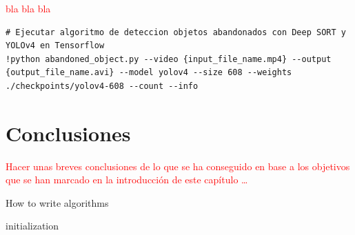 \textcolor{red}{bla bla bla}

\vspace{0.5cm}
\begin{lstlisting}[language=iPython,caption=Evaluación de la detección de objetos abandonados con DeepSORT y YOLOv4 en Tensorflow (2),captionpos=b,label={lst:evaluate-abandoned-object2}]
# Ejecutar algoritmo de deteccion objetos abandonados con Deep SORT y YOLOv4 en Tensorflow
!python abandoned_object.py --video {input_file_name.mp4} --output {output_file_name.avi} --model yolov4 --size 608 --weights ./checkpoints/yolov4-608 --count --info
\end{lstlisting}


\newpage

\section{Conclusiones}
\label{sec:conclu-desarrollo}

\textcolor{red}{Hacer unas breves conclusiones de lo que se ha conseguido en base a los objetivos que se han marcado en la introducción de este capítulo \ldots}

\begin{algorithm}[H]
 \caption{How to write algorithms}
 \label{alg:howto}
 initialization\;
\end{algorithm}
